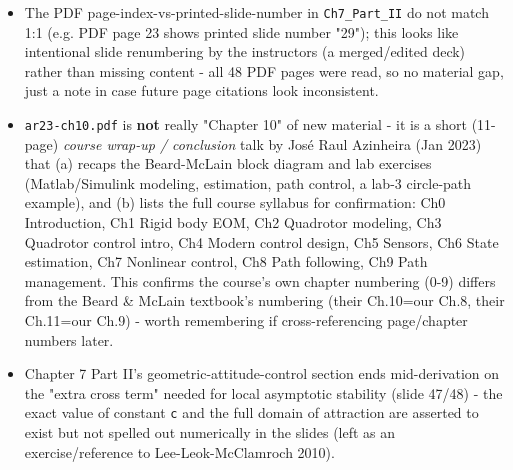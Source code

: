 \documentclass[11pt]{article}
\begin{document}
\begin{itemize}
\item The PDF page-index-vs-printed-slide-number in \texttt{Ch7\_\allowbreak{}Part\_\allowbreak{}II} do not match 1:1 (e.g. PDF page 23 shows printed slide number "29"); this looks like intentional slide renumbering by the instructors (a merged/edited deck) rather than missing content - all 48 PDF pages were read, so no material gap, just a note in case future page citations look inconsistent.
\item \texttt{ar23-ch10.pdf} is \textbf{not} really "Chapter 10" of new material - it is a short (11-page) \textit{course wrap-up / conclusion} talk by José Raul Azinheira (Jan 2023) that (a) recaps the Beard-McLain block diagram and lab exercises (Matlab/Simulink modeling, estimation, path control, a lab-3 circle-path example), and (b) lists the full course syllabus for confirmation: Ch0 Introduction, Ch1 Rigid body EOM, Ch2 Quadrotor modeling, Ch3 Quadrotor control intro, Ch4 Modern control design, Ch5 Sensors, Ch6 State estimation, Ch7 Nonlinear control, Ch8 Path following, Ch9 Path management. This confirms the course's own chapter numbering (0-9) differs from the Beard \& McLain textbook's numbering (their Ch.10=our Ch.8, their Ch.11=our Ch.9) - worth remembering if cross-referencing page/chapter numbers later.
\item Chapter 7 Part II's geometric-attitude-control section ends mid-derivation on the "extra cross term" needed for local asymptotic stability (slide 47/48) - the exact value of constant \texttt{c} and the full domain of attraction are asserted to exist but not spelled out numerically in the slides (left as an exercise/reference to Lee-Leok-McClamroch 2010).
\end{itemize}
\end{document}
